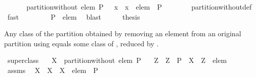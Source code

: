 \begin{isabellebody}
%
\isadelimproof
%
\endisadelimproof
%
\isatagproof
{}\isamarkupfalse%
\ {\isacharminus}\isanewline
\ \ \isamarkupfalse%
\ {\isachardoublequoteopen}{\isasymUnion}\ partition{\isacharunderscore}without\ elem\ P\ {\isacharequal}\ {\isasymUnion}\ {\isacharparenleft}{\isacharparenleft}{\isasymlambda}x\ {\isachardot}\ x\ {\isacharminus}\ {\isacharbraceleft}elem{\isacharbraceright}{\isacharparenright}\ {\isacharbackquote}\ P\ {\isacharminus}\ {\isacharbraceleft}{\isacharbraceleft}{\isacharbraceright}{\isacharbraceright}{\isacharparenright}{\isachardoublequoteclose}\isanewline
\ \ \ \ \isamarkupfalse%
\ partition{\isacharunderscore}without{\isacharunderscore}def\ \isamarkupfalse%
\ fast\isanewline
\ \ \isamarkupfalse%
\ \isamarkupfalse%
\ {\isachardoublequoteopen}{\isasymdots}\ {\isacharequal}\ {\isasymUnion}\ P\ {\isacharminus}\ {\isacharbraceleft}elem{\isacharbraceright}{\isachardoublequoteclose}\ \isamarkupfalse%
\ blast\isanewline
\ \ \isamarkupfalse%
\ \isamarkupfalse%
\ {\isacharquery}thesis\ \isacommand{{\isachardot}}\isamarkupfalse%
\isanewline
{}\isamarkupfalse%
%
\endisatagproof
{\isafoldproof}%
%
\isadelimproof
%
\endisadelimproof
%
\begin{isamarkuptext}%
Any class of the partition obtained by removing an element  from an
  original partition  using  equals some
  class of , reduced by .%
\end{isamarkuptext}%
\isamarkuptrue%
\isamarkupfalse%
\ super{\isacharunderscore}class{\isacharcolon}\isanewline
\ \ \ {\isachardoublequoteopen}X\ {\isasymin}\ partition{\isacharunderscore}without\ elem\ P{\isachardoublequoteclose}\isanewline
\ \ \ Z\ \ {\isachardoublequoteopen}Z\ {\isasymin}\ P{\isachardoublequoteclose}\ \ {\isachardoublequoteopen}X\ {\isacharequal}\ Z\ {\isacharminus}\ {\isacharbraceleft}elem{\isacharbraceright}{\isachardoublequoteclose}\isanewline
%
\isadelimproof
%
\endisadelimproof
%
\isatagproof
{}\isamarkupfalse%
\ {\isacharminus}\isanewline
\ \ \isamarkupfalse%
\ assms\ \isamarkupfalse%
\ {\isachardoublequoteopen}X\ {\isasymin}\ {\isacharparenleft}{\isasymlambda}X\ {\isachardot}\ X\ {\isacharminus}\ {\isacharbraceleft}elem{\isacharbraceright}{\isacharparenright}\ {\isacharbackquote}\ P\ {\isacharminus}\ {\isacharbraceleft}{\isacharbraceleft}{\isacharbraceright}{\isacharbraceright}{\isachardoublequoteclose}\ \isamarkupfalse%

\end{isabellebody}
